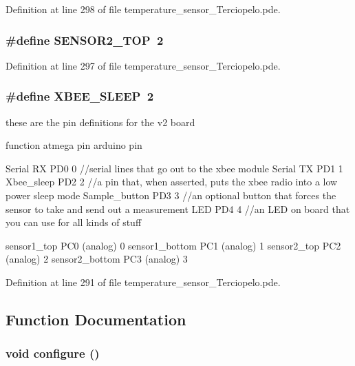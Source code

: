 Definition at line 298 of file temperature\_\-sensor\_\-Terciopelo.pde.\hypertarget{temperature__sensor___terciopelo_8pde_645141ae2ab7fa7ac3f690c4959b6baf}{
\subsubsection[{SENSOR2\_\-TOP}]{\setlength{\rightskip}{0pt plus 5cm}\#define SENSOR2\_\-TOP~2}}
\label{temperature__sensor___terciopelo_8pde_645141ae2ab7fa7ac3f690c4959b6baf}




Definition at line 297 of file temperature\_\-sensor\_\-Terciopelo.pde.\hypertarget{temperature__sensor___terciopelo_8pde_658c2878485cfe5cc625d283a6d34bc1}{
\subsubsection[{XBEE\_\-SLEEP}]{\setlength{\rightskip}{0pt plus 5cm}\#define XBEE\_\-SLEEP~2}}
\label{temperature__sensor___terciopelo_8pde_658c2878485cfe5cc625d283a6d34bc1}


these are the pin definitions for the v2 board

function atmega pin arduino pin

Serial RX PD0 0 //serial lines that go out to the xbee module Serial TX PD1 1 Xbee\_\-sleep PD2 2 //a pin that, when asserted, puts the xbee radio into a low power sleep mode Sample\_\-button PD3 3 //an optional button that forces the sensor to take and send out a measurement LED PD4 4 //an LED on board that you can use for all kinds of stuff

sensor1\_\-top PC0 (analog) 0 sensor1\_\-bottom PC1 (analog) 1 sensor2\_\-top PC2 (analog) 2 sensor2\_\-bottom PC3 (analog) 3 

Definition at line 291 of file temperature\_\-sensor\_\-Terciopelo.pde.

\subsection{Function Documentation}
\hypertarget{temperature__sensor___terciopelo_8pde_e369b3765489ee8bd0ea791c1843630f}{
\subsubsection[{configure}]{\setlength{\rightskip}{0pt plus 5cm}void configure ()}}
\label{temperature__sensor___terciopelo_8pde_e369b3765489ee8bd0ea791c1843630f}


